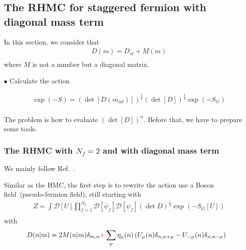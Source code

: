 \subsection{\label{sec:rhmc_diagonal}The RHMC for staggered fermion with diagonal mass term}

In this section, we consider that
\begin{equation}
\begin{split}
&D(m)=D_{st}+M(m)\\
\end{split}
\end{equation}
where $M$ is not a number but a diagonal matrix.

$\bullet$ Calculate the action

\begin{equation}
\begin{split}
&\exp(-S)=\left(\det [D(m_{ud})]\right)^{\frac{1}{2}}\left(\det [D]\right)^{\frac{1}{4}} \exp (-S_G)\\
\end{split}
\end{equation}

The problem is how to evaluate $\left(\det [D]\right)^{\alpha}$. Before that, we have to prepare some tools.

\subsubsection{\label{sec:hmcofrhmc_diagonal}The RHMC with \texorpdfstring{$N_f=2$}{Nf=2} and with diagonal mass term}

We mainly follow Ref.~\cite{staggeredRHMC}.

Similar as the HMC, the first step is to rewrite the action use a Boson field~(pseudo-fermion field), still starting with
\begin{equation}
\begin{split}
&Z=\int \mathcal{D}[U] \prod _{f=1}^{N_f} \mathcal {D}[\bar{\psi}_f]\mathcal {D}[\psi _f]\left(\det D\right)^{\frac{1}{4}}\exp \left(-S_G[U]\right)\\
\end{split}
\end{equation}
with
\begin{equation}
\begin{split}
&D(n|m)=2M(n|m)\delta _{m,n} \textcolor[rgb]{1,0,0}{+} \sum _{\mu}\eta _{\mu}(n)\left(U_{\mu}(n) \delta _{n,n+\mu} - U_{-\mu}(n)\delta _{n,n-\mu}\right)\\
\end{split}
\end{equation}

